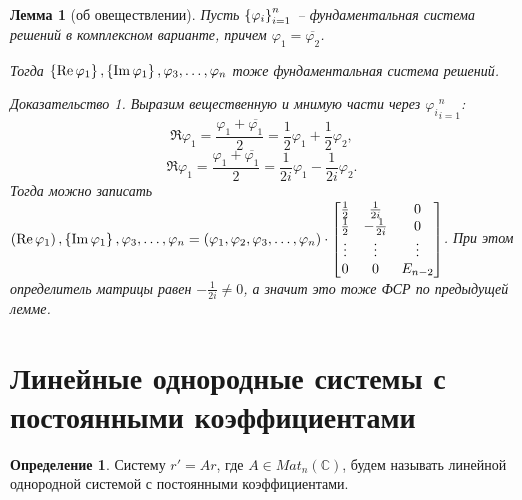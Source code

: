 \documentclass[a5paper, 10pt]{article}
\theoremstyle{definition}
\newtheorem{Def}{Определение}
\theoremstyle{plain}
\newtheorem{Lem}{Лемма}
\theoremstyle{remark}
\newtheorem*{Proof}{Доказательство}
\begin{document}
	\begin{Lem}[об овеществлении]
		Пусть $\left\{\varphi_i\right\}_{i=1}^n$ -- фундаментальная система решений в комплексном варианте, причем $\varphi_1 = \overline{\varphi_2}$.
		
		Тогда $\left\{\mathop{\mathrm{Re}}{\varphi_1}\right\}, \left\{\mathop{\mathrm{Im}}{\varphi_1}\right\}, \varphi_3, \dots, \varphi_n$ тоже фундаментальная система решений.
		\begin{Proof}
			Выразим вещественную и мнимую части через ${\varphi_i}_{i=1}^n$:
			\[
			\Re{\varphi_1} = \frac{\varphi_1 + \overline{\varphi_1}}{2} = \frac12 \varphi_1 + \frac12 \varphi_2,
			\]
			\[
			\Re{\varphi_1} = \frac{\varphi_1 + \overline{\varphi_1}}{2} = \frac1{2i} \varphi_1 - \frac1{2i} \varphi_2.
			\]
			Тогда можно записать $\left(\mathop{\mathrm{Re}}{\varphi_1}\right), \left\{\mathop{\mathrm{Im}}{\varphi_1}\right\}, \varphi_3, \dots, \varphi_n = \left(\varphi_1, \varphi_2, \varphi_3, \dots, \varphi_n\right) \cdot \begin{bmatrix}
					\frac12 & \frac1{2i} & 0\\
					\frac12 & -\frac1{2i} & 0\\
					\vdots & \vdots & \vdots \\
					0 & 0 & E_{n-2} 
				\end{bmatrix}$. 
			При этом определитель матрицы равен $-\frac1{2i} \neq 0$, а значит это тоже ФСР по предыдущей лемме.
		\end{Proof}
	\end{Lem}
	
	\section[ЛОС с постоянными коэффициентами]{Линейные однородные системы с постоянными коэффициентами}
	\begin{Def}
		Систему $r' = A r$, где $A\in Mat_n(\mathbb{C})$, будем называть линейной однородной системой с постоянными коэффициентами.
	\end{Def}
\end{document}
